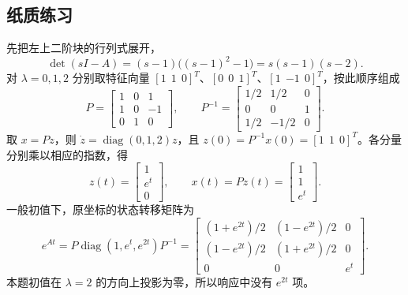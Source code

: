 \subsection{纸质练习}



\sol 先把左上二阶块的行列式展开，
\[
    \det(sI-A)=(s-1)\bigl((s-1)^2-1\bigr)
              =s(s-1)(s-2).
\]
对 $\lambda=0,1,2$ 分别取特征向量 $[1\ \ 1\ \ 0]^T$、$[0\ \ 0\ \ 1]^T$、$[1\ \ {-1}\ \ 0]^T$，按此顺序组成
\[
    P=\begin{bmatrix}1&0&1\\1&0&-1\\0&1&0\end{bmatrix},\qquad
    P^{-1}=\begin{bmatrix}1/2&1/2&0\\0&0&1\\1/2&-1/2&0\end{bmatrix}.
\]
取 $x=Pz$，则 $\dot z=\operatorname{diag}(0,1,2)z$，且
$z(0)=P^{-1}x(0)=[1\ \ 1\ \ 0]^T$。各分量分别乘以相应的指数，得
\[
    z(t)=\begin{bmatrix}1\\e^t\\0\end{bmatrix},\qquad
    \boxed{x(t)=Pz(t)=\begin{bmatrix}1\\1\\e^t\end{bmatrix}.}
\]
一般初值下，原坐标的状态转移矩阵为
\[
    e^{At}=P\operatorname{diag}(1,e^t,e^{2t})P^{-1}
    =\begin{bmatrix}
    (1+e^{2t})/2&(1-e^{2t})/2&0\\
    (1-e^{2t})/2&(1+e^{2t})/2&0\\
    0&0&e^t
    \end{bmatrix}.
\]
本题初值在 $\lambda=2$ 的方向上投影为零，所以响应中没有 $e^{2t}$ 项。


